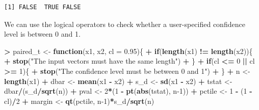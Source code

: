 \documentclass[
]{krantz}
\makeatletter
\newenvironment{Shaded}{\begin{snugshade}}{\end{snugshade}}
\newcommand{\ControlFlowTok}[1]{\textcolor[rgb]{0.27,0.27,0.27}{\textbf{#1}}}
\newcommand{\DataTypeTok}[1]{\textcolor[rgb]{0.27,0.27,0.27}{#1}}
\newcommand{\DecValTok}[1]{\textcolor[rgb]{0.06,0.06,0.06}{#1}}
\newcommand{\FloatTok}[1]{\textcolor[rgb]{0.06,0.06,0.06}{#1}}
\newcommand{\KeywordTok}[1]{\textcolor[rgb]{0.27,0.27,0.27}{\textbf{#1}}}
\newcommand{\NormalTok}[1]{#1}
\newcommand{\OperatorTok}[1]{\textcolor[rgb]{0.43,0.43,0.43}{\textbf{#1}}}
\newcommand{\StringTok}[1]{\textcolor[rgb]{0.5,0.5,0.5}{#1}}
\newenvironment{kframe}{%
\medskip{}
\setlength{\fboxsep}{.8em}
 \def\at@end@of@kframe{}%
 \ifinner\ifhmode%
  \def\at@end@of@kframe{\end{minipage}}%
  \begin{minipage}{\columnwidth}%
 \fi\fi%
 \def\FrameCommand##1{\hskip\@totalleftmargin \hskip-\fboxsep
 \colorbox{shadecolor}{##1}\hskip-\fboxsep
     \hskip-\linewidth \hskip-\@totalleftmargin \hskip\columnwidth}%
 \MakeFramed {\advance\hsize-\width
   \@totalleftmargin\z@ \linewidth\hsize
   \@setminipage}}%
 {\par\unskip\endMakeFramed%
 \at@end@of@kframe}
\renewenvironment{Shaded}{\begin{kframe}}{\end{kframe}}
\makeatother
\begin{document}
\begin{verbatim}
[1] FALSE  TRUE FALSE
\end{verbatim}

We can use the logical operators to check whether a user-specified confidence level is between 0 and 1.

\begin{Shaded}
\begin{Highlighting}[]
\OperatorTok{\textgreater{}}\StringTok{ }\NormalTok{paired\_t \textless{}{-}}\StringTok{ }\ControlFlowTok{function}\NormalTok{(x1, x2, }\DataTypeTok{cl =} \FloatTok{0.95}\NormalTok{)\{}
\OperatorTok{+}\StringTok{     }\ControlFlowTok{if}\NormalTok{(}\KeywordTok{length}\NormalTok{(x1) }\OperatorTok{!=}\StringTok{ }\KeywordTok{length}\NormalTok{(x2))\{}
\OperatorTok{+}\StringTok{         }\KeywordTok{stop}\NormalTok{(}\StringTok{"The input vectors  must have the same length"}\NormalTok{)}
\OperatorTok{+}\StringTok{     }\NormalTok{\}}
\OperatorTok{+}\StringTok{     }\ControlFlowTok{if}\NormalTok{(cl }\OperatorTok{\textless{}=}\StringTok{ }\DecValTok{0} \OperatorTok{||}\StringTok{ }\NormalTok{cl }\OperatorTok{\textgreater{}=}\StringTok{ }\DecValTok{1}\NormalTok{)\{}
\OperatorTok{+}\StringTok{         }\KeywordTok{stop}\NormalTok{(}\StringTok{"The confidence level must be between 0 and 1"}\NormalTok{)}
\OperatorTok{+}\StringTok{     }\NormalTok{\}}
\OperatorTok{+}\StringTok{     }\NormalTok{n \textless{}{-}}\StringTok{ }\KeywordTok{length}\NormalTok{(x1)}
\OperatorTok{+}\StringTok{     }\NormalTok{dbar \textless{}{-}}\StringTok{ }\KeywordTok{mean}\NormalTok{(x1 }\OperatorTok{{-}}\StringTok{ }\NormalTok{x2)}
\OperatorTok{+}\StringTok{     }\NormalTok{s\_d \textless{}{-}}\StringTok{ }\KeywordTok{sd}\NormalTok{(x1 }\OperatorTok{{-}}\StringTok{ }\NormalTok{x2)}
\OperatorTok{+}\StringTok{     }\NormalTok{tstat \textless{}{-}}\StringTok{ }\NormalTok{dbar}\OperatorTok{/}\NormalTok{(s\_d}\OperatorTok{/}\KeywordTok{sqrt}\NormalTok{(n))}
\OperatorTok{+}\StringTok{     }\NormalTok{pval \textless{}{-}}\StringTok{ }\DecValTok{2}\OperatorTok{*}\NormalTok{(}\DecValTok{1} \OperatorTok{{-}}\StringTok{ }\KeywordTok{pt}\NormalTok{(}\KeywordTok{abs}\NormalTok{(tstat), n}\DecValTok{{-}1}\NormalTok{))}
\OperatorTok{+}\StringTok{     }\NormalTok{pctile \textless{}{-}}\StringTok{ }\DecValTok{1} \OperatorTok{{-}}\StringTok{ }\NormalTok{(}\DecValTok{1} \OperatorTok{{-}}\StringTok{ }\NormalTok{cl)}\OperatorTok{/}\DecValTok{2}
\OperatorTok{+}\StringTok{     }\NormalTok{margin \textless{}{-}}\StringTok{ }\KeywordTok{qt}\NormalTok{(pctile, n}\DecValTok{{-}1}\NormalTok{)}\OperatorTok{*}\NormalTok{s\_d}\OperatorTok{/}\KeywordTok{sqrt}\NormalTok{(n)}

\end{Highlighting}
\end{Shaded}
\end{document}
